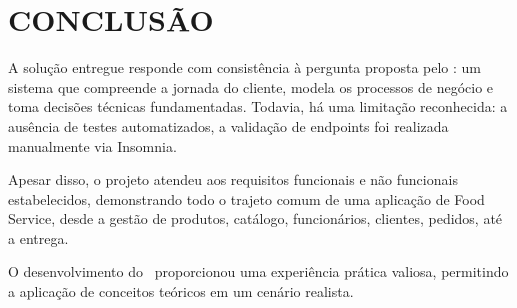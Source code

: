 \chapter{CONCLUSÃO}

\hspace{0.5cm} A solução entregue responde com consistência à pergunta proposta pelo \tipotrabalho:
um sistema que compreende a jornada do cliente, modela os processos de negócio e toma decisões técnicas
fundamentadas. Todavia, há uma limitação reconhecida: a ausência de testes automatizados, a validação
de endpoints foi realizada manualmente via Insomnia.

Apesar disso, o projeto atendeu aos requisitos funcionais e não funcionais estabelecidos,
demonstrando todo o trajeto comum de uma aplicação de Food Service, desde a gestão de produtos, catálogo,
funcionários, clientes, pedidos, até a entrega.

O desenvolvimento do \tipotrabalho\ proporcionou uma experiência prática valiosa,
permitindo a aplicação de conceitos teóricos em um cenário realista.
